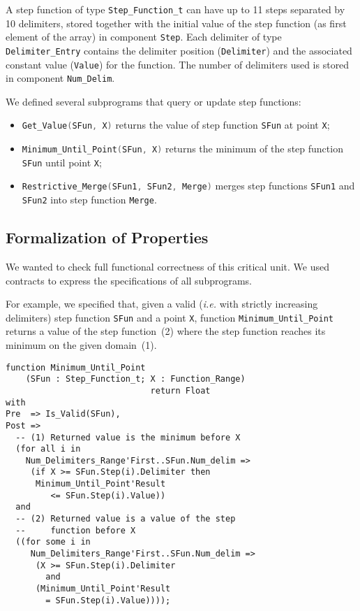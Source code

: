 \documentclass[10pt,a4paper,twocolumn]{article}
\newcommand{\ie}{\textit{i.e.}\xspace}
\newcommand{\SPARK}[1]{\lstinline[language=Ada,basicstyle={\footnotesize
      \sffamily},framesep=0pt]$#1$}
\begin{document}
A step function of type \SPARK{Step_Function_t} can have up to 11 steps
separated by 10 delimiters, stored together with the initial value of the step
function (as first element of the array) in component \SPARK{Step}. Each
delimiter of type \SPARK{Delimiter_Entry} contains the delimiter position
(\SPARK{Delimiter}) and the associated constant value (\SPARK{Value}) for the
function. The number of delimiters used is stored in component
\SPARK{Num_Delim}.

We defined several subprograms that query or update step functions:
\begin{itemize}
\item \SPARK{Get_Value(SFun, X)} returns the value of step function \SPARK{SFun}
  at point \SPARK{X};
\item \SPARK{Minimum_Until_Point(SFun, X)} returns the minimum of the step
  function \SPARK{SFun} until point \SPARK{X};
\item \SPARK{Restrictive_Merge(SFun1, SFun2, Merge)} merges step functions
  \SPARK{SFun1} and \SPARK{SFun2} into step function \SPARK{Merge}.
\end{itemize}

\subsection{Formalization of Properties}

We wanted to check full functional correctness of this critical unit. We used
contracts to express the specifications of all subprograms.

For example, we specified that, given a valid (\ie with strictly increasing
delimiters) step function \SPARK{SFun} and a point \SPARK{X}, function
\SPARK{Minimum_Until_Point} returns a value of the step function~(2) where the
step function reaches its minimum on the given domain~(1).

\begin{lstlisting}
function Minimum_Until_Point
    (SFun : Step_Function_t; X : Function_Range)
                             return Float
with
Pre  => Is_Valid(SFun),
Post =>
  -- (1) Returned value is the minimum before X
  (for all i in
    Num_Delimiters_Range'First..SFun.Num_delim =>
     (if X >= SFun.Step(i).Delimiter then
      Minimum_Until_Point'Result
         <= SFun.Step(i).Value))
  and
  -- (2) Returned value is a value of the step
  --     function before X
  ((for some i in
     Num_Delimiters_Range'First..SFun.Num_delim =>
      (X >= SFun.Step(i).Delimiter
        and
      (Minimum_Until_Point'Result
        = SFun.Step(i).Value))));
\end{lstlisting}
\end{document}
